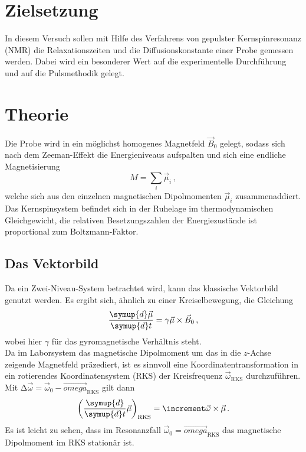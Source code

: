 \section{Zielsetzung}

    \noindent In diesem Versuch sollen mit Hilfe des Verfahrens von gepulster Kernspinresonanz (NMR) die Relaxationszeiten und die Diffusionskonstante einer Probe gemessen werden. 
    Dabei wird ein besonderer Wert auf die experimentelle Durchführung und auf die Pulsmethodik gelegt.  


\section{Theorie}
\label{sec:theorie}

    \noindent Die Probe wird in ein möglichst homogenes Magnetfeld $\vec{B}_0$ gelegt, sodass sich nach dem Zeeman-Effekt die Energieniveaus aufspalten und sich eine endliche Magnetisierung 
    \begin{equation*}
        M = \sum_i \vec{\mu}_i\, ,
    \end{equation*}
    welche sich aus den einzelnen magnetischen Dipolmomenten $\vec{\mu}_i$ zusammenaddiert. Das Kernspinsystem befindet sich in der Ruhelage im thermodynamischen Gleichgewicht, die relativen Besetzungszahlen 
    der Energiezustände ist proportional zum Boltzmann-Faktor.

    \subsection{Das Vektorbild}

        \noindent Da ein Zwei-Niveau-System betrachtet wird, kann das klassische Vektorbild genutzt werden. Es ergibt sich, ähnlich zu einer Kreiselbewegung, die Gleichung 
        \begin{equation*}
            \frac{\symup{d} \vec{\mu}}{\symup{d} t} = \gamma \vec{\mu} \times \vec{B}_0\, ,
        \end{equation*}
        wobei hier $\gamma$ für das gyromagnetische Verhältnis steht. \\ 

        \noindent Da im Laborsystem das magnetische Dipolmoment um das in die $z$-Achse zeigende Magnetfeld präzediert, ist es sinnvoll eine Koordinatentransformation in ein rotierendes Koordinatensystem (RKS) 
        der Kreisfrequenz $\vec{\omega}_\text{RKS}$ durchzuführen. Mit $\increment \vec{\omega} = \vec{\omega}_0 - \vec{omega}_\text{RKS}$ gilt dann 
        \begin{equation*}
            \left(\frac{\symup{d}}{\symup{d}t} \vec{\mu}\right)_\text{RKS} = \increment \vec{\omega} \times \vec{\mu}\, .
        \end{equation*} 
        Es ist leicht zu sehen, dass im Resonanzfall $\vec{\omega}_0 = \vec{omega}_\text{RKS}$ das magnetische Dipolmoment im RKS stationär ist. \\

